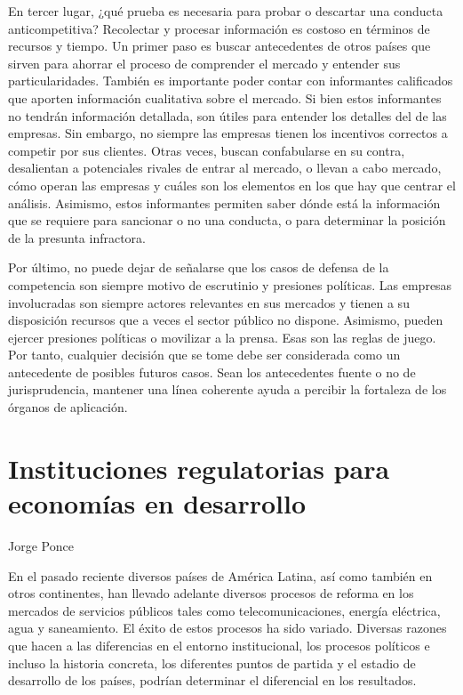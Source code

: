 \documentclass[
  12pt,
  spanish,
]{book}
\begin{document}
En tercer lugar, ¿qué prueba es necesaria para probar o descartar una conducta anticompetitiva? Recolectar y procesar información es costoso en términos de recursos y tiempo. Un primer paso es buscar antecedentes de otros países que sirven para ahorrar el proceso de comprender el mercado y entender sus particularidades. También es importante poder contar con informantes calificados que aporten información cualitativa sobre el mercado. Si bien estos informantes no tendrán información detallada, son útiles para entender los detalles del de las empresas. Sin embargo, no siempre las empresas tienen los incentivos correctos a competir por sus clientes. Otras veces, buscan confabularse en su contra, desalientan a potenciales rivales de entrar al mercado, o llevan a cabo mercado, cómo operan las empresas y cuáles son los elementos en los que hay que centrar el análisis. Asimismo, estos informantes permiten saber dónde está la información que se requiere para sancionar o no una conducta, o para determinar la posición de la presunta infractora.

Por último, no puede dejar de señalarse que los casos de defensa de la competencia son siempre motivo de escrutinio y presiones políticas. Las empresas involucradas son siempre actores relevantes en sus mercados y tienen a su disposición recursos que a veces el sector público no dispone. Asimismo, pueden ejercer presiones políticas o movilizar a la prensa. Esas son las reglas de juego. Por tanto, cualquier decisión que se tome debe ser considerada como un antecedente de posibles futuros casos. Sean los antecedentes fuente o no de jurisprudencia, mantener una línea coherente ayuda a percibir la fortaleza de los órganos de aplicación.

\hypertarget{instituciones-reg}{%
\chapter{Instituciones regulatorias para economías en desarrollo}\label{instituciones-reg}}

Jorge Ponce

En el pasado reciente diversos países de América Latina, así como también en otros continentes, han llevado adelante diversos procesos de reforma en los mercados de servicios públicos tales como telecomunicaciones, energía eléctrica, agua y saneamiento. El éxito de estos procesos ha sido variado. Diversas razones que hacen a las diferencias en el entorno institucional, los procesos políticos e incluso la historia concreta, los diferentes puntos de partida y el estadio de desarrollo de los países, podrían determinar el diferencial en los resultados.
\end{document}
